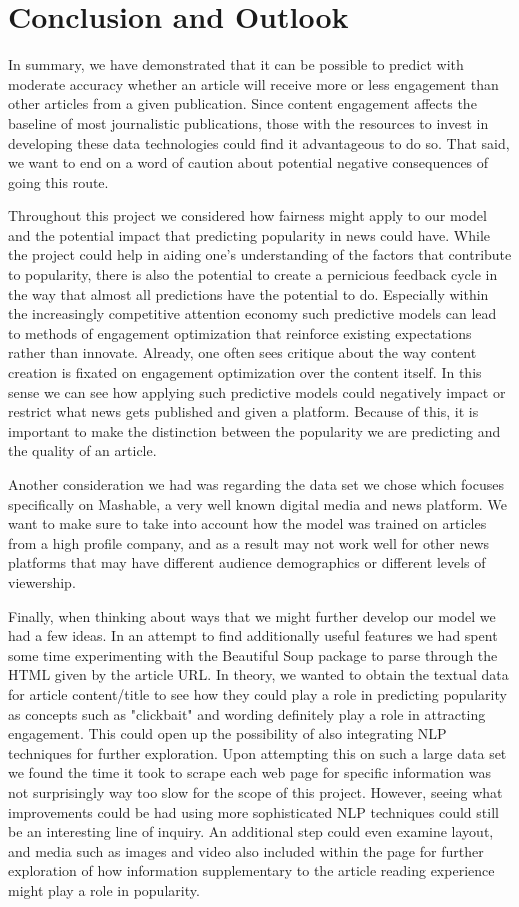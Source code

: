 \documentclass{article}
\begin{document}
\section{Conclusion and Outlook}
In summary, we have demonstrated that it can be possible to predict with moderate accuracy whether an article will receive more or less engagement than other articles from a given publication. Since content engagement affects the baseline of most journalistic publications, those with the resources to invest in developing these data technologies could find it advantageous to do so. That said, we want to end on a word of caution about potential negative consequences of going this route.

Throughout this project we considered how fairness might apply to our model and the potential impact that predicting popularity in news could have. While the project could help in aiding one's understanding of the factors that contribute to popularity, there is also the potential to create a pernicious feedback cycle in the way that almost all predictions have the potential to do. Especially within the increasingly competitive attention economy such predictive models can lead to methods of engagement optimization that reinforce existing expectations rather than innovate. Already, one often sees critique about the way content creation is fixated on engagement optimization over the content itself. In this sense we can see how applying such predictive models could negatively impact or restrict what news gets published and given a platform. Because of this, it is important to make the distinction between the popularity we are predicting and the quality of an article.

Another consideration we had was regarding the data set we chose which focuses specifically on Mashable, a very well known digital media and news platform. We want to make sure to take into account how the model was trained on articles from a high profile company, and as a result may not work well for other news platforms that may have different audience demographics or different levels of viewership.

Finally, when thinking about ways that we might further develop our model we had a few ideas. In an attempt to find additionally useful features we had spent some time experimenting with the Beautiful Soup package to parse through the HTML given by the article URL. In theory, we wanted to obtain the textual data for article content/title to see how they could play a role in predicting popularity as concepts such as "clickbait" and wording definitely play a role in attracting engagement. This could open up the possibility of also integrating NLP techniques for further exploration. Upon attempting this on such a large data set we found the time it took to scrape each web page for specific information was not surprisingly way too slow for the scope of this project. However, seeing what improvements could be had using more sophisticated NLP techniques could still be an interesting line of inquiry. An additional step could even examine layout, and media such as images and video also included within the page for further exploration of how information supplementary to the article reading experience might play a role in popularity. 
\end{document}
